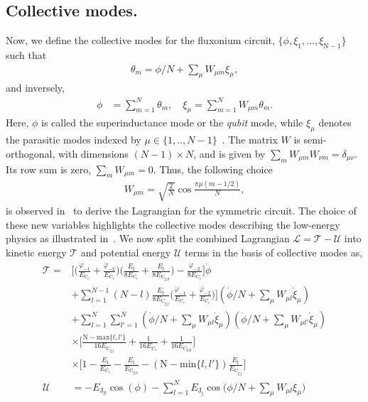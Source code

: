 \documentclass[%
reprint,
superscriptaddress,
 amsmath,amssymb,
 aps,
 prx,
longbibliography,
floatfix,
]{revtex4-2}
\begin{document}
\subsection{Collective modes.} 
Now, we define the collective modes for the fluxonium circuit, $\{\phi,\xi_1,...,\xi_{\textrm{N}-1}\}$ such that 
\begin{align}
    \theta_m=\phi/N+\sum_\mu W_{\mu m}\xi_\mu,
\end{align}
and inversely,
\begin{align}
    \phi&=\sum_{m=1}^N\theta_m,\quad \xi_\mu=\sum_{m=1}^N W_{\mu m}\theta_m.
\end{align}
Here, $\phi$ is called the superinductance mode or the \emph{qubit} mode, while $\xi_\mu$ denotes the parasitic modes indexed by $\mu\in\{1,..,N-1\}$~\cite{ferguson2013symmetries}. The matrix $W$ is semi-orthogonal, with dimensions $(N-1)\times N$, and is given by $\sum_m W_{\mu m}W_{\nu m}=\delta_{\mu \nu}$. Its row sum is zero, $\sum_mW_{\mu m}=0$. Thus, the following choice
\begin{align}
    W_{\mu m}=\sqrt{\frac{2}{N}}\cos{\frac{\pi\mu(m-1/2)}{N}},
\end{align}
is observed in~\cite{ferguson2013symmetries} to derive the Lagrangian for the symmetric circuit. The choice of these new variables highlights the collective modes describing the low-energy physics as illustrated in~\cite{catelani2011relaxation,koch2009charging,manucharyan2009fluxonium}. We now split the combined Lagrangian $\mathcal{L}=\mathcal{T}-\mathcal{U}$ into kinetic energy $\mathcal{T}$ and potential energy $\mathcal{U}$ terms in the basis of collective modes as,
\begin{align}
\mathcal{T}=&\Big[\Big(\frac{\dot{\varphi}_{-1}}{E_{\textrm{C}_\textrm{c}}}+\frac{\dot{\varphi}_{-2}}{E_{\textrm{C}_\textrm{c}}}\Big)\Big(\frac{E_{\textrm{t}}}{8E_{\textrm{C}_\textrm{c}}}+\frac{E_{\textrm{t}}}{8E_{\textrm{C}_\textrm{g,p}}}\Big)-\frac{\dot{\varphi}_{-2}}{8E_{\textrm{C}_\textrm{c}}}\Big]\dot{\phi}\nonumber\\&+\sum_{l=1}^{N-1}(N-l)\frac{E_{\textrm{t}}}{8E_{\textrm{C}_\textrm{g,j}}}\Big(\frac{\dot{\varphi}_{-1}}{E_{\textrm{C}_\textrm{c}}}+\frac{\dot{\varphi}_{-2}}{E_{\textrm{C}_\textrm{c}}}\Big)\Big](\dot{\phi}/N+\sum_\mu W_{\mu l}\dot{\xi}_\mu)\nonumber\\
  &+\sum_{l=1}^N\sum_{l'=1}^N(\dot{\phi}/N+\sum_\mu W_{\mu l}\dot{\xi}_\mu)(\dot{\phi}/N+\sum_\mu W_{\mu l'}\dot{\xi}_\mu)\nonumber\\
  &\times\Big[\frac{\textrm{N}-\text{max}\{l,l'\}}{16E_{\textrm{C}_\textrm{g,j}}}+\frac{1}{16E_{\textrm{C}_\textrm{c}}}+\frac{1}{16E_{\textrm{C}_\textrm{g,p}}}\Big]\nonumber\\&\times\Big[1-\frac{E_\textrm{t}}{E_{\textrm{C}_\textrm{c}}}-\frac{E_\textrm{t}}{E_{\textrm{C}_\textrm{g,p}}}-(\textrm{N}-\text{min}\{l,l'\})\frac{E_\textrm{t}}{E_{\textrm{C}_\textrm{g,j}}}\Big]\label{eq:kin-energy}\\
    \mathcal{U}&=-E_{\textrm{J}_\textrm{p}}\cos(\phi)-\sum_{l=1}^NE_{\textrm{J}_\textrm{j}}\cos\Big(\phi/N+\sum_\mu W_{\mu l}\xi_\mu\Big)\label{eq:pot-energy}
\end{align}
\end{document}
